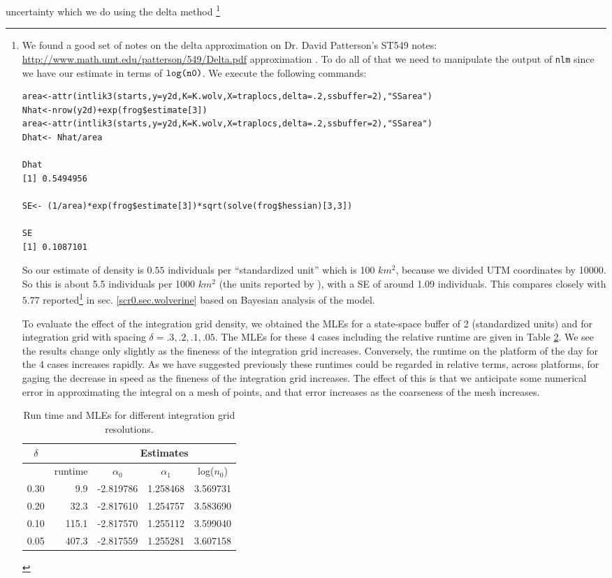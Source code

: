 uncertainty which we do using the delta method \footnote{
We found a good set of notes on the delta approximation on Dr. David
Patterson's ST549 notes: 
\url{http://www.math.umt.edu/patterson/549/Delta.pdf}
 approximation
\citep[][Appendix F4]{williams_etal:2002}.
To do all of that we need to manipulate the output of
\mbox{\tt nlm} since we have our  estimate in terms of $\mbox{\tt
  log(n0)}$. We execute the following commands:
{\small 
\begin{verbatim}
area<-attr(intlik3(starts,y=y2d,K=K.wolv,X=traplocs,delta=.2,ssbuffer=2),"SSarea")
Nhat<-nrow(y2d)+exp(frog$estimate[3])
area<-attr(intlik3(starts,y=y2d,K=K.wolv,X=traplocs,delta=.2,ssbuffer=2),"SSarea")
Dhat<- Nhat/area

Dhat
[1] 0.5494956

SE<- (1/area)*exp(frog$estimate[3])*sqrt(solve(frog$hessian)[3,3])

SE
[1] 0.1087101
\end{verbatim}
} 
So our estimate of density is $0.55$ individuals per ``standardized
unit'' which is 100 $km^2$, because we divided UTM coordinates by
10000.  So this is about 5.5 individuals per 1000 $km^2$ (the units
reported by \citep{royle_etal:2011jwm}), with a SE of around 1.09
individuals.  This compares closely with $5.77$
reported\footnote{check this!!!} in
sec. \ref{scr0.sec.wolverine} based on Bayesian
analysis of the model.


To evaluate the effect of the integration grid density, 
we obtained the MLEs for a state-space buffer of 2 (standardized
units) and for integration grid with spacing $\delta = .3, .2, .1,
.05$. The MLEs for these 4 cases including the relative runtime are
given in Table \ref{mle.tab.integration}.
We see the results change only slightly as the fineness of the
integration grid increases. Conversely, the runtime on the platform of
the day for the 4 cases increases rapidly. 
As we have suggested previously these runtimes could be regarded in
relative terms,  across platforms, for gaging the decrease in
speed as the fineness of the integration grid increases. The effect of
this is that we anticipate some numerical error in approximating the
integral on a mesh of points, and that error increases as the
coarseness of the mesh increases. 


\begin{table}[ht]
\centering
\caption{Run time and MLEs for different integration grid resolutions.}
\begin{tabular}{crccc}
\hline \hline
$\delta$ &   & \multicolumn{3}{c}{Estimates} \\ \hline
         &  runtime        & $\alpha_0$ & $\alpha_1$ & log($n_0$) \\ \hline
 0.30   &  9.9  &  -2.819786 & 1.258468 & 3.569731  \\
 0.20   & 32.3  &  -2.817610 & 1.254757 & 3.583690 \\
 0.10  & 115.1  &  -2.817570 & 1.255112 & 3.599040 \\
 0.05 &  407.3 &   -2.817559&  1.255281&  3.607158 \\ \hline
\end{tabular}
\label{mle.tab.integration}
\end{table}


}
